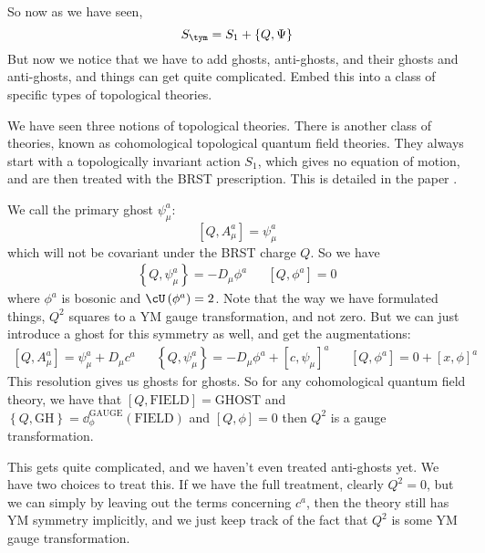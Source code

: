 \documentclass{booc}
\begin{document}
So now as we have seen, 
\begin{equation}
S_{\tym} = S_1 + \left\{ Q , \Psi \right\}
\end{equation}
But now we notice that we have to add ghosts, anti-ghosts, and their ghosts and anti-ghosts, 
and things can get quite complicated.
Embed this into a class of specific types of topological theories. 

\begin{wrn}
We have seen three notions of topological theories. 
There is another class of theories, known as cohomological topological quantum field theories. 
They always start with a topologically invariant action $S_1$, which gives no equation of motion,
and are then treated with the BRST prescription.
This is detailed in the paper \cite{witten_cqft}.
\end{wrn}

We call the primary ghost $\psi_\mu^a$:
\begin{equation}
\left[ Q , A_\mu^a \right] = \psi_\mu^a
\end{equation}
which will not be covariant under the BRST charge $Q$. 
So we have
\begin{align}
\left\{ Q , \psi_\mu^a \right\} = - D_\mu \phi^a
&&
\left[ Q , \phi^a \right] = 0
\end{align}
where $\phi^a$ is bosonic and $\cU\left( \phi^a \right) = 2$.
Note that the way we have formulated things, 
$Q^2$ squares to a YM gauge transformation, and not zero. 
But we can just introduce a ghost for this symmetry as well, and get the augmentations:
\begin{align}
\left[ Q , A_\mu^a \right]= \psi_\mu^a + D_\mu c^a
&&
\left\{ Q , \psi_\mu^a \right\} = -D_\mu \phi^a + \left[ c , \psi_\mu \right]^a
&&
\left[ Q , \phi^a \right] = 0 + \left[ x , \phi \right]^a
\end{align}
This resolution gives us ghosts for ghosts. 
So for any cohomological quantum field theory, 
we have that $\left[ Q , \text{FIELD} \right] = \text{GHOST}$
and $\left\{ Q , \text{GH} \right\} = \dd_\phi^{\text{GAUGE}}\left( \text{FIELD} \right)$
and $\left[ Q , \phi \right] = 0$ then $Q^2$ is a gauge transformation.

This gets quite complicated, 
and we haven't even treated anti-ghosts yet. 
We have two choices to treat this. If we have the full treatment, clearly
$Q^2 = 0$, but we can simply by leaving out the terms concerning $c^a$, 
then the theory still has YM symmetry implicitly, and we just keep track
of the fact that $Q^2$ is some YM gauge transformation.
\end{document}

